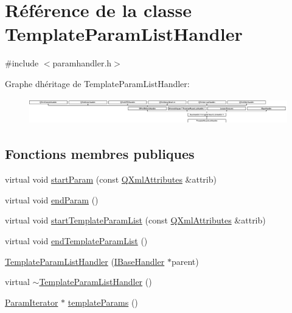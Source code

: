 \hypertarget{class_template_param_list_handler}{}\section{Référence de la classe Template\+Param\+List\+Handler}
\label{class_template_param_list_handler}


{\ttfamily \#include $<$paramhandler.\+h$>$}

Graphe d\textquotesingle{}héritage de Template\+Param\+List\+Handler\+:\begin{figure}[H]
\begin{center}
\leavevmode
\includegraphics[height=1.134752cm]{class_template_param_list_handler}
\end{center}
\end{figure}
\subsection*{Fonctions membres publiques}
\begin{DoxyCompactItemize}
\item 
virtual void \hyperlink{class_template_param_list_handler_a837b521c7130d512244b322264e4b641}{start\+Param} (const \hyperlink{class_q_xml_attributes}{Q\+Xml\+Attributes} \&attrib)
\item 
virtual void \hyperlink{class_template_param_list_handler_ab8cf25022e54fb7579de90965016941b}{end\+Param} ()
\item 
virtual void \hyperlink{class_template_param_list_handler_aa4ec312732083c8944ee9cbfcafb85f1}{start\+Template\+Param\+List} (const \hyperlink{class_q_xml_attributes}{Q\+Xml\+Attributes} \&attrib)
\item 
virtual void \hyperlink{class_template_param_list_handler_ad1bc9c2624603ba93fa6db1cd39fde8c}{end\+Template\+Param\+List} ()
\item 
\hyperlink{class_template_param_list_handler_a60c98132bd203ad79090d8d7c0971980}{Template\+Param\+List\+Handler} (\hyperlink{class_i_base_handler}{I\+Base\+Handler} $\ast$parent)
\item 
virtual \hyperlink{class_template_param_list_handler_a4b3add09dd171b20c02b0488d73cbace}{$\sim$\+Template\+Param\+List\+Handler} ()
\item 
\hyperlink{class_param_iterator}{Param\+Iterator} $\ast$ \hyperlink{class_template_param_list_handler_a946f9972b2f93f643139c0726d7f2861}{template\+Params} ()
\end{DoxyCompactItemize}
